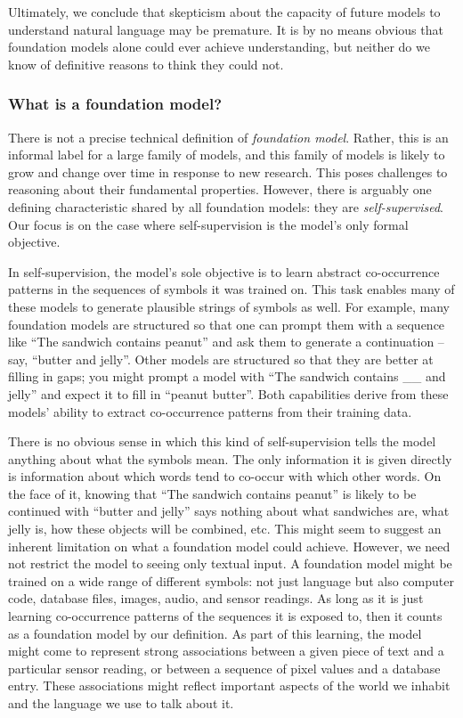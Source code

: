 Ultimately, we conclude that skepticism about the capacity of future models to understand natural language may be premature. It is by no means obvious that foundation models alone could ever achieve understanding, but neither do we know of definitive reasons to think they could not.

\subsubsection{What is a foundation model?}

There is not a precise technical definition of \textit{foundation model}. Rather, this is an informal label for a large family of models, and this family of models is likely to grow and change over time in response to new research. This poses challenges to reasoning about their fundamental properties. However, there is arguably one defining characteristic shared by all foundation models: they are \textit{self-supervised}. Our focus is on the case where self-supervision is the model’s only formal objective.

In self-supervision, the model’s sole objective is to learn abstract co-occurrence patterns in the sequences of symbols it was trained on. This task enables many of these models to generate plausible strings of symbols as well. For example, many foundation models are structured so that one can prompt them with a sequence like ``The sandwich contains peanut'' and ask them to generate a continuation – say, ``butter and jelly''. Other models are structured so that they are better at filling in gaps; you might prompt a model with ``The sandwich contains \_\_ and jelly'' and expect it to fill in ``peanut butter''. Both capabilities derive from these models’ ability to extract co-occurrence patterns from their training data.

There is no obvious sense in which this kind of self-supervision tells the model anything about what the symbols mean. The only information it is given directly is information about which words tend to co-occur with which other words. On the face of it, knowing that ``The sandwich contains peanut'' is likely to be continued with ``butter and jelly'' says nothing about what sandwiches are, what jelly is, how these objects will be combined, etc. This might seem to suggest an inherent limitation on what a foundation model could achieve. However, we need not restrict the model to seeing only textual input. A foundation model might be trained on a wide range of different symbols: not just language but also computer code, database files, images, audio, and sensor readings. As long as it is just learning co-occurrence patterns of the sequences it is exposed to, then it counts as a foundation model by our definition. As part of this learning, the model might come to represent strong associations between a given piece of text and a particular sensor reading, or between a sequence of pixel values and a database entry. These associations might reflect important aspects of the world we inhabit and the language we use to talk about it.

